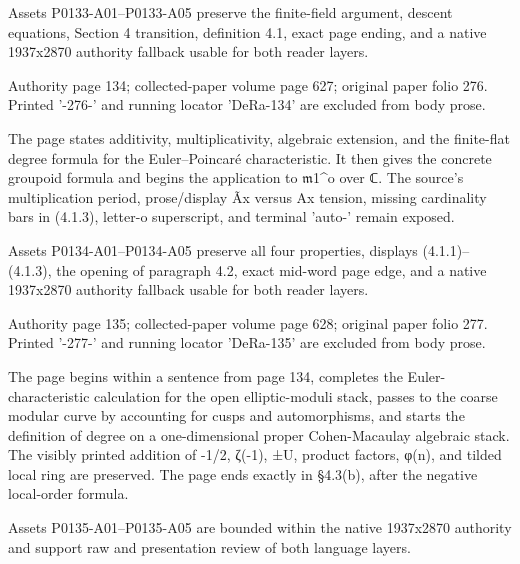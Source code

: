 \documentclass[11pt,a4paper]{article}
\begin{document}
Assets P0133-A01--P0133-A05 preserve the finite-field argument, descent equations, Section 4 transition, definition 4.1, exact page ending, and a native 1937x2870 authority fallback usable for both reader layers.


\par\medskip
\hypertarget{D018-P0134}{}
\par\smallskip
Authority page 134; collected-paper volume page 627; original paper folio 276. Printed '-276-' and running locator 'DeRa-134' are excluded from body prose.

The page states additivity, multiplicativity, algebraic extension, and the finite-flat degree formula for the Euler--Poincaré characteristic. It then gives the concrete groupoid formula and begins the application to \ensuremath{\mathfrak{m}}\textunderscore{}1\textasciicircum{}o over ℂ. The source's multiplication period, prose/display Ã\textunderscore{}x versus A\textunderscore{}x tension, missing cardinality bars in (4.1.3), letter-o superscript, and terminal 'auto-' remain exposed.

Assets P0134-A01--P0134-A05 preserve all four properties, displays (4.1.1)--(4.1.3), the opening of paragraph 4.2, exact mid-word page edge, and a native 1937x2870 authority fallback usable for both reader layers.


\par\medskip
\hypertarget{D018-P0135}{}
\par\smallskip
Authority page 135; collected-paper volume page 628; original paper folio 277. Printed '-277-' and running locator 'DeRa-135' are excluded from body prose.

The page begins within a sentence from page 134, completes the Euler-characteristic calculation for the open elliptic-moduli stack, passes to the coarse modular curve by accounting for cusps and automorphisms, and starts the definition of degree on a one-dimensional proper Cohen-Macaulay algebraic stack. The visibly printed addition of -1/2, ζ(-1), ±U, product factors, φ(n), and tilded local ring are preserved. The page ends exactly in §4.3(b), after the negative local-order formula.

Assets P0135-A01--P0135-A05 are bounded within the native 1937x2870 authority and support raw and presentation review of both language layers.
\end{document}
